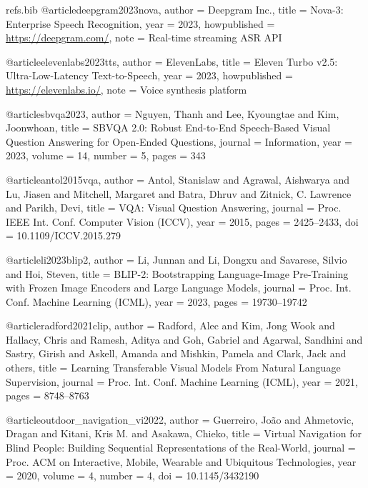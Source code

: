 \begin{filecontents*}{refs.bib}
@article{deepgram2023nova,
  author    = {{Deepgram Inc.}},
  title     = {Nova-3: Enterprise Speech Recognition},
  year      = {2023},
  howpublished = {\url{https://deepgram.com/}},
  note      = {Real-time streaming ASR API}
}

@article{elevenlabs2023tts,
  author    = {{ElevenLabs}},
  title     = {Eleven Turbo v2.5: Ultra-Low-Latency Text-to-Speech},
  year      = {2023},
  howpublished = {\url{https://elevenlabs.io/}},
  note      = {Voice synthesis platform}
}

@article{sbvqa2023,
  author    = {Nguyen, Thanh and Lee, Kyoungtae and Kim, Joonwhoan},
  title     = {{SBVQA 2.0}: Robust End-to-End Speech-Based Visual Question Answering for Open-Ended Questions},
  journal   = {Information},
  year      = {2023},
  volume    = {14},
  number    = {5},
  pages     = {343}
}


@article{antol2015vqa,
  author    = {Antol, Stanislaw and Agrawal, Aishwarya and Lu, Jiasen and Mitchell, Margaret and Batra, Dhruv and Zitnick, C. Lawrence and Parikh, Devi},
  title     = {{VQA}: Visual Question Answering},
  journal   = {Proc. IEEE Int. Conf. Computer Vision (ICCV)},
  year      = {2015},
  pages     = {2425--2433},
  doi       = {10.1109/ICCV.2015.279}
}

@article{li2023blip2,
  author    = {Li, Junnan and Li, Dongxu and Savarese, Silvio and Hoi, Steven},
  title     = {{BLIP-2}: Bootstrapping Language-Image Pre-Training with Frozen Image Encoders and Large Language Models},
  journal   = {Proc. Int. Conf. Machine Learning (ICML)},
  year      = {2023},
  pages     = {19730--19742}
}

@article{radford2021clip,
  author    = {Radford, Alec and Kim, Jong Wook and Hallacy, Chris and Ramesh, Aditya and Goh, Gabriel and Agarwal, Sandhini and Sastry, Girish and Askell, Amanda and Mishkin, Pamela and Clark, Jack and others},
  title     = {Learning Transferable Visual Models From Natural Language Supervision},
  journal   = {Proc. Int. Conf. Machine Learning (ICML)},
  year      = {2021},
  pages     = {8748--8763}
}


@article{outdoor_navigation_vi2022,
  author    = {Guerreiro, Jo{\~a}o and Ahmetovic, Dragan and Kitani, Kris M. and Asakawa, Chieko},
  title     = {Virtual Navigation for Blind People: Building Sequential Representations of the Real-World},
  journal   = {Proc. ACM on Interactive, Mobile, Wearable and Ubiquitous Technologies},
  year      = {2020},
  volume    = {4},
  number    = {4},
  doi       = {10.1145/3432190}
}


\end{filecontents*}
